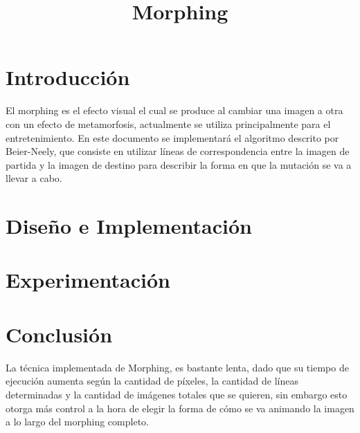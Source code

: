 \documentclass[conference]{IEEEtran}
\begin{document}
\title{Morphing}
\author{
}


\maketitle

\begin{abstract}
	
\end{abstract}
 

\section*{Introducción} %
	El morphing es el efecto visual el cual se produce al cambiar una imagen a otra con un efecto de metamorfosis, actualmente se utiliza principalmente para el entretenimiento. En este documento se implementará el algoritmo descrito por Beier-Neely, que consiste en utilizar líneas de correspondencia entre la imagen de partida y la imagen de destino para describir la forma en que la mutación se va a llevar a cabo.

\section*{Diseño e Implementación}
	
\section*{Experimentación}
	
\section*{Conclusión}
	La técnica implementada de Morphing, es bastante lenta, dado que su tiempo de ejecución aumenta según la cantidad de píxeles, la cantidad de líneas determinadas y la cantidad de imágenes totales que se quieren, sin embargo esto otorga más control a la hora de elegir la forma de cómo se va animando la imagen a lo largo del morphing completo.
	
\begin{thebibliography}{99}

\end{thebibliography}
\end{document}

